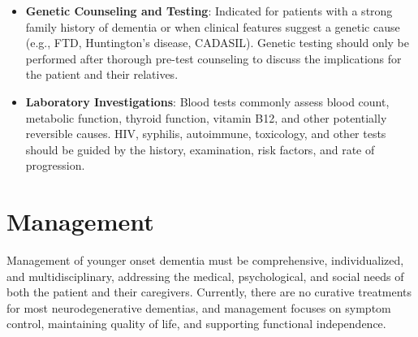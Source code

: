 \begin{itemize}
    \item \textbf{Genetic Counseling and Testing}: Indicated for patients with a strong family history of dementia or when clinical features suggest a genetic cause (e.g., FTD, Huntington's disease, CADASIL). Genetic testing should only be performed after thorough pre-test counseling to discuss the implications for the patient and their relatives.
    \item \textbf{Laboratory Investigations}: Blood tests commonly assess blood count, metabolic function, thyroid function, vitamin B12, and other potentially reversible causes. HIV, syphilis, autoimmune, toxicology, and other tests should be guided by the history, examination, risk factors, and rate of progression.
\end{itemize}

\section*{Management}
Management of younger onset dementia must be comprehensive, individualized, and multidisciplinary, addressing the medical, psychological, and social needs of both the patient and their caregivers. Currently, there are no curative treatments for most neurodegenerative dementias, and management focuses on symptom control, maintaining quality of life, and supporting functional independence.

